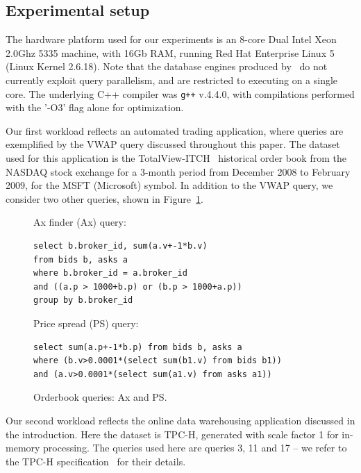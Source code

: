 \subsection{Experimental setup}
The hardware platform used for our experiments is an 8-core Dual Intel Xeon
2.0Ghz 5335 machine, with 16Gb RAM, running Red Hat Enterprise Linux 5 (Linux
Kernel 2.6.18). Note that the database engines produced by \compiler\ do not
currently exploit query parallelism, and are restricted to executing on a single
core. The underlying C++ compiler was \texttt{g++} v.4.4.0, with compilations
performed with the '-O3' flag alone for optimization.

Our first workload reflects an automated trading application, where queries are
exemplified by the VWAP query discussed throughout this paper.  The dataset used
for this application is the TotalView-ITCH~\cite{totalview-url} historical order
book from the NASDAQ stock exchange for a 3-month period from December 2008 to
February 2009, for the MSFT (Microsoft) symbol. In addition to the VWAP query,
we consider two other queries, shown in Figure~\ref{fig:obqueries}.

\begin{figure}[htbp]
Ax finder (Ax) query:
\begin{Verbatim}
select b.broker_id, sum(a.v+-1*b.v)
from bids b, asks a
where b.broker_id = a.broker_id
and ((a.p > 1000+b.p) or (b.p > 1000+a.p))
group by b.broker_id
\end{Verbatim}
Price spread (PS) query:
\begin{Verbatim}
select sum(a.p+-1*b.p) from bids b, asks a
where (b.v>0.0001*(select sum(b1.v) from bids b1))
and (a.v>0.0001*(select sum(a1.v) from asks a1))
\end{Verbatim}
\vspace{-3mm}
\caption{Orderbook queries: Ax and PS.}
\label{fig:obqueries}
\end{figure}

Our second workload reflects the online data warehousing application discussed
in the introduction. Here the dataset is TPC-H, generated with scale factor 1
for in-memory processing. The queries used here are queries 3, 11 and 17 --
we refer to the TPC-H specification~\cite{tpch-url} for their details.

